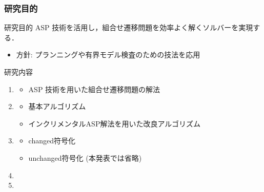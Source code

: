 \documentclass[dvipdfmx,11pt]{beamer}
\begin{document}
\begin{frame}
  \frametitle{研究目的}
  \begin{alertblock}{研究目的}
    ASP 技術を活用し，組合せ遷移問題を効率よく解くソルバーを実現する．
  \end{alertblock}
  \begin{itemize}
  \item 方針: プランニングや有界モデル検査のための技法を応用
  \end{itemize}
  \begin{block}{研究内容}
    \begin{enumerate}
    \item {}
      \begin{itemize}
      \item ASP 技術を用いた組合せ遷移問題の解法
      \end{itemize}
    \item {}
      \begin{itemize}
      \item 基本アルゴリズム
      \item インクリメンタルASP解法を用いた改良アルゴリズム
      \end{itemize}
    \item {}
      \begin{itemize}
      \item \textsf{changed}符号化
      \item \textsf{unchanged}符号化 (本発表では省略)
      \end{itemize}
    \item {}
    \item {}
    \end{enumerate}
  \end{block}
\end{frame}
\end{document}
